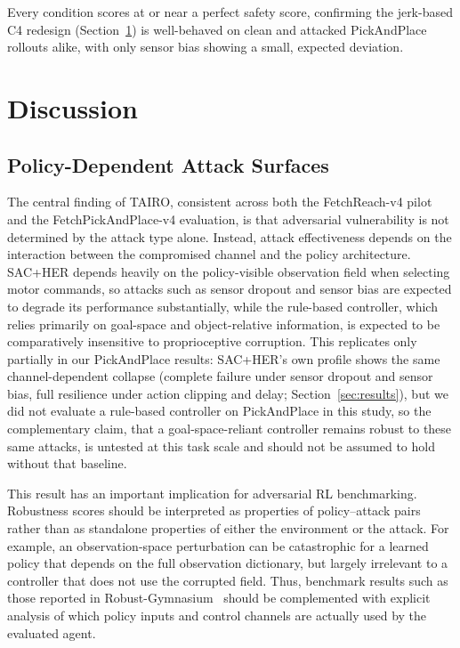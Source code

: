 \documentclass[conference]{IEEEtran}
\begin{document}
Every condition scores at or near a perfect safety score, confirming the jerk-based C4
redesign (Section~\ref{sec:discussion}) is well-behaved on clean and attacked
PickAndPlace rollouts alike, with only sensor bias showing a small, expected deviation.


\section{Discussion}
\label{sec:discussion}

\subsection{Policy-Dependent Attack Surfaces}

The central finding of TAIRO, consistent across both the FetchReach-v4 pilot and the
FetchPickAndPlace-v4 evaluation, is that adversarial vulnerability is not determined by
the attack type alone. Instead, attack effectiveness depends on the interaction between
the compromised channel and the policy architecture. SAC+HER depends heavily on the
policy-visible observation field when selecting motor commands, so attacks such as
sensor dropout and sensor bias are expected to degrade its performance substantially,
while the rule-based controller, which relies primarily on goal-space and
object-relative information, is expected to be comparatively insensitive to
proprioceptive corruption. This replicates only partially in our PickAndPlace results:
SAC+HER's own profile shows the same channel-dependent collapse (complete failure
under sensor dropout and sensor bias, full resilience under action clipping and delay;
Section~\ref{sec:results}), but we did not evaluate a rule-based controller on
PickAndPlace in this study, so the complementary claim, that a goal-space-reliant
controller remains robust to these same attacks, is untested at this task scale and
should not be assumed to hold without that baseline.

This result has an important implication for adversarial RL benchmarking. Robustness
scores should be interpreted as properties of policy--attack pairs rather than as
standalone properties of either the environment or the attack. For example, an
observation-space perturbation can be catastrophic for a learned policy that depends on
the full observation dictionary, but largely irrelevant to a controller that does not
use the corrupted field. Thus, benchmark results such as those reported in
Robust-Gymnasium~\cite{gu2025robustgymnasium} should be complemented with explicit
analysis of which policy inputs and control channels are actually used by the evaluated
agent.
\end{document}
